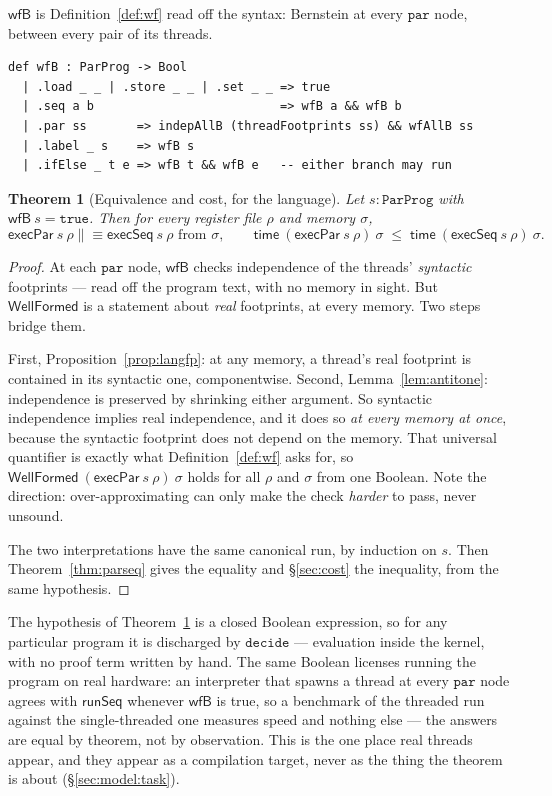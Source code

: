 \documentclass[11pt,a4paper]{article}
\theoremstyle{definition}
\theoremstyle{plain}
\newtheorem{theorem}[definition]{Theorem}
\theoremstyle{remark}
\newcommand{\st}{\sigma}
\newcommand{\runSeq}{\mathsf{runSeq}}
\newcommand{\wf}{\mathsf{WellFormed}}
\newcommand{\spn}{\mathsf{time}}
\begin{document}
$\mathsf{wfB}$ is Definition~\ref{def:wf} read off the syntax: Bernstein at every
$\texttt{par}$ node, between every pair of its threads.
\begin{lstlisting}
def wfB : ParProg -> Bool
  | .load _ _ | .store _ _ | .set _ _ => true
  | .seq a b                          => wfB a && wfB b
  | .par ss       => indepAllB (threadFootprints ss) && wfAllB ss
  | .label _ s    => wfB s
  | .ifElse _ t e => wfB t && wfB e   -- either branch may run
\end{lstlisting}

\begin{theorem}[Equivalence and cost, for the language]\label{thm:lang}
Let $s : \texttt{ParProg}$ with $\mathsf{wfB}\ s = \mathtt{true}$. Then for every register
file $\rho$ and memory $\st$,
\[
  \mathsf{execPar}\ s\ \rho \mathrel{\|\!\equiv} \mathsf{execSeq}\ s\ \rho \text{ from } \st,
  \qquad
  \spn\ (\mathsf{execPar}\ s\ \rho)\ \st \;\le\; \spn\ (\mathsf{execSeq}\ s\ \rho)\ \st .
\]
\end{theorem}

\begin{proof}
At each $\texttt{par}$ node, $\mathsf{wfB}$ checks independence of the threads'
\emph{syntactic} footprints --- read off the program text, with no memory in sight. But $\wf$
is a statement about \emph{real} footprints, at every memory. Two steps bridge them.

First, Proposition~\ref{prop:langfp}: at any memory, a thread's real footprint is contained
in its syntactic one, componentwise. Second, Lemma~\ref{lem:antitone}: independence is
preserved by shrinking either argument. So syntactic independence implies real independence,
and it does so \emph{at every memory at once}, because the syntactic footprint does not
depend on the memory. That universal quantifier is exactly what Definition~\ref{def:wf}
asks for, so $\wf\ (\mathsf{execPar}\ s\ \rho)\ \st$ holds for all $\rho$ and $\st$ from one
Boolean. Note the direction: over-approximating can only make the check \emph{harder} to
pass, never unsound.

The two interpretations have the same canonical run, by induction on $s$. Then
Theorem~\ref{thm:parseq} gives the equality and \S\ref{sec:cost} the inequality, from the
same hypothesis.
\end{proof}

The hypothesis of Theorem~\ref{thm:lang} is a closed Boolean expression, so for any
particular program it is discharged by $\mathtt{decide}$ --- evaluation inside the kernel,
with no proof term written by hand. The same Boolean licenses running the program on real
hardware: an interpreter that spawns a thread at every $\texttt{par}$ node agrees with
$\runSeq$ whenever $\mathsf{wfB}$ is true, so a benchmark of the threaded run against the
single-threaded one measures speed and nothing else --- the answers are equal by theorem, not
by observation. This is the one place real threads appear, and they appear as a compilation
target, never as the thing the theorem is about (\S\ref{sec:model:task}).
\end{document}

